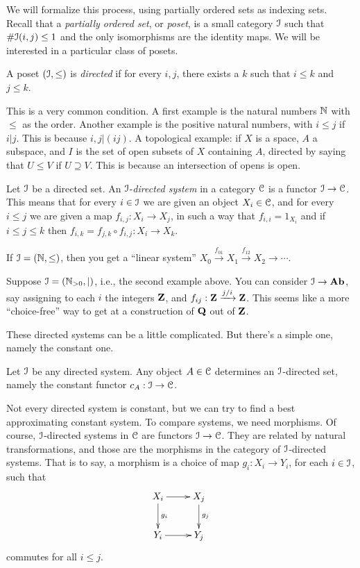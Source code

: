 We will formalize this process, using partially ordered sets as indexing sets.
Recall that a {\em partially ordered set}, or {\em poset}, is a small category $\mathcal I$ such that $\#\mathcal I(i,j)\leq 1$ and the only isomorphisms are the identity maps. We will be interested in a particular class of posets.
\begin{definition}
A poset $(\mathcal I,\leq)$ is \emph{directed} if for every $i,j$, there exists a $k$ such that $i\leq k$ and $j\leq k$.
\end{definition}
\begin{example}
This is a very common condition.
A first example is the natural numbers $\mathbb N$ with $\leq$ as the order. Another example is the positive natural numbers, with $i\leq j$ if $i|j$. This is because $i,j|(ij)$. A topological example: if $X$ is a space, $A$ a subspace, and 
$I$ is the set of open subsets of $X$ containing $A$, directed by saying that $U\leq V$ if $U\supseteq V$. This is because an intersection of opens is open.
\end{example}
\begin{definition}
Let $\mathcal I$ be a directed set. An $\mathcal I$-{\em directed system} in  a category $\mathcal C$ is a functor $\mathcal I\to\mathcal C$. This means that for every $i\in \mathcal I$ we are given an object $X_i\in\mathcal C$, and for every $i\leq j$ we are given a map $f_{i,j}:X_i\to X_j$, in such a way that $f_{i,i}=1_{X_i}$ and if $i\leq j\leq k$
then $f_{i,k}=f_{j,k}\circ f_{i,j}:X_i\to X_k$. 
\end{definition}
\begin{example}\label{linear}
If $\mathcal I=(\mathbb N,\leq)$, then you get a ``linear system'' $X_0\xrightarrow{f_{01}}X_1\xrightarrow{f_{12}}X_2\to\cdots$. 
\end{example}
\begin{example}
Suppose $\mathcal I=(\mathbb N_{>0},|)$, i.e., the second example above. You can consider $\mathcal I\to\mathbf{Ab}$, say assigning to each $i$ the integers $\mathbf Z$, and $f_{ij}:\mathbf Z\xrightarrow{j/i}\mathbf Z$. This seems like a more ``choice-free'' way to get at a construction of $\mathbf Q$ out of $\mathbf Z$. 
\end{example}
These directed systems can be a little complicated. But there's a simple one, namely the constant one. 
\begin{example}
Let $\mathcal I$ be any directed system. Any object $A\in\mathcal C$ determines an $\mathcal I$-directed set, namely the constant functor $c_A:\mathcal I\to\mathcal C$.
\end{example}
Not every directed system is constant, but we can try to find a best approximating constant system. To compare systems, we need morphisms. 
Of course, $\mathcal I$-directed systems in $\mathcal C$ are functors $\mathcal I\to\mathcal C$. They are related by natural transformations, and those are the morphisms in the category of $\mathcal I$-directed systems. That is to say, a morphism is a choice of map $g_i:X_i\to Y_i$, for each $i\in\mathcal I$, such that 
\begin{equation*}
\xymatrix{X_i\ar[r]\ar[d]^{g_i} & X_j\ar[d]^{g_j}\\
Y_i\ar[r] & Y_j}
\end{equation*}
commutes for all $i\leq j$.


